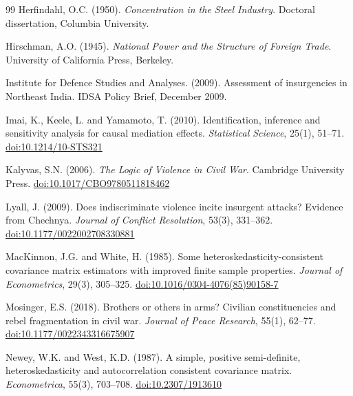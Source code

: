 \documentclass[12pt,a4paper]{article}
\begin{document}
{\begin{thebibliography}{99}
Herfindahl, O.C. (1950). \textit{Concentration in the Steel Industry}. Doctoral dissertation, Columbia University.

Hirschman, A.O. (1945). \textit{National Power and the Structure of Foreign Trade}. University of California Press, Berkeley.

Institute for Defence Studies and Analyses. (2009). Assessment of insurgencies in Northeast India. IDSA Policy Brief, December 2009.

Imai, K., Keele, L. and Yamamoto, T. (2010). Identification, inference and sensitivity analysis for causal mediation effects. \textit{Statistical Science}, 25(1), 51--71. \href{https://doi.org/10.1214/10-STS321}{doi:10.1214/10-STS321}

Kalyvas, S.N. (2006). \textit{The Logic of Violence in Civil War}. Cambridge University Press. \href{https://doi.org/10.1017/CBO9780511818462}{doi:10.1017/CBO9780511818462}

Lyall, J. (2009). Does indiscriminate violence incite insurgent attacks? Evidence from Chechnya. \textit{Journal of Conflict Resolution}, 53(3), 331--362. \href{https://doi.org/10.1177/0022002708330881}{doi:10.1177/0022002708330881}

MacKinnon, J.G. and White, H. (1985). Some heteroskedasticity-consistent covariance matrix estimators with improved finite sample properties. \textit{Journal of Econometrics}, 29(3), 305--325. \href{https://doi.org/10.1016/0304-4076(85)90158-7}{doi:10.1016/0304-4076(85)90158-7}

Mosinger, E.S. (2018). Brothers or others in arms? Civilian constituencies and rebel fragmentation in civil war. \textit{Journal of Peace Research}, 55(1), 62--77. \href{https://doi.org/10.1177/0022343316675907}{doi:10.1177/0022343316675907}

Newey, W.K. and West, K.D. (1987). A simple, positive semi-definite, heteroskedasticity and autocorrelation consistent covariance matrix. \textit{Econometrica}, 55(3), 703--708. \href{https://doi.org/10.2307/1913610}{doi:10.2307/1913610}


\end{thebibliography}}
\end{document}
